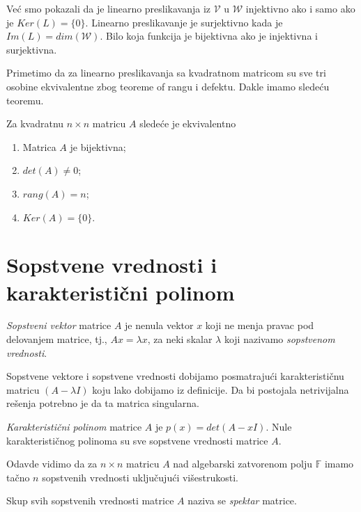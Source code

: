 \documentclass{article}
\begin{document}
Već smo pokazali da je linearno preslikavanja iz $\mathcal{V}$ u $\mathcal{W}$ injektivno ako i samo ako je $Ker(L) = \{0\}$.
Linearno preslikavanje je surjektivno kada je $Im(L) = dim(\mathcal{W})$.
Bilo koja funkcija je bijektivna ako je injektivna i surjektivna.

Primetimo da za linearno preslikavanja sa kvadratnom matricom su sve tri osobine ekvivalentne zbog teoreme of rangu i defektu.
Dakle imamo sledeću teoremu.

\begin{theorem}
  Za kvadratnu $n \times n$ matricu $A$ sledeće je ekvivalentno
  \begin{enumerate}
    \item Matrica $A$ je bijektivna;
    \item $det(A) \neq 0$;
    \item $rang(A) = n$;
    \item $Ker(A) = \{0\}$.
  \end{enumerate}
\end{theorem}

\section{Sopstvene vrednosti i karakteristični polinom}

\begin{definition}
  \textit{Sopstveni vektor} matrice $A$ je nenula vektor $x$ koji ne menja pravac pod delovanjem matrice, tj., $Ax = \lambda x$, za neki skalar $\lambda$ koji nazivamo \textit{sopstvenom vrednosti}.
\end{definition}

Sopstvene vektore i sopstvene vrednosti dobijamo posmatrajući karakterističnu matricu $(A - \lambda I)$ koju lako dobijamo iz definicije.
Da bi postojala netrivijalna rešenja potrebno je da ta matrica singularna.

\begin{definition}
  \textit{Karakteristični polinom} matrice $A$ je $p(x) = det(A - x I)$.
  Nule karakterističnog polinoma su sve sopstvene vrednosti matrice $A$.
\end{definition}

Odavde vidimo da za $n \times n$ matricu $A$ nad algebarski zatvorenom polju $\mathbb{F}$ imamo tačno $n$ sopstvenih vrednosti uključujući višestrukosti.

\begin{definition}[Spektar]
  Skup svih sopstvenih vrednosti matrice $A$ naziva se \textit{spektar} matrice.
\end{definition}
\end{document}

